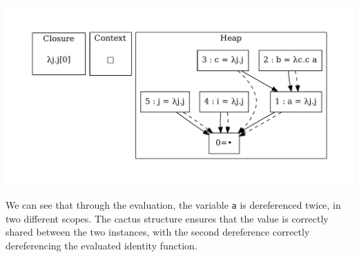 \includegraphics[width=\linewidth/2]{figures/23.pdf}

We can see that through the evaluation, the variable \texttt{a} is dereferenced
twice, in two different scopes. The cactus structure ensures that the value is
correctly shared between the two instances, with the second dereference
correctly dereferencing the evaluated identity function. 


